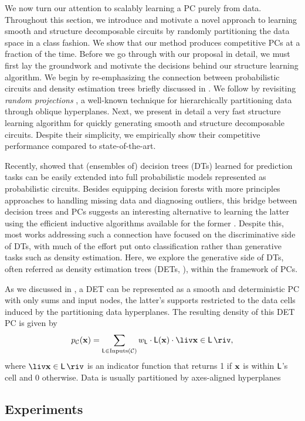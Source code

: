 We now turn our attention to scalably learning a PC purely from data. Throughout this section, we
introduce and motivate a novel approach to learning smooth and structure decomposable circuits by
randomly partitioning the data space in a \divclass{} class fashion. We show that our method
produces competitive PCs at a fraction of the time. Before we go through with our proposal in
detail, we must first lay the groundwork and motivate the decisions behind our structure learning
algorithm. We begin by re-emphasizing the connection between probabilistic circuits and density
estimation trees briefly discussed in . We follow by revisiting \emph{random
projections} \citep{dasgupta08a,dasgupta08b}, a well-known technique for hierarchically
partitioning data through oblique hyperplanes. Next, we present in detail a very fast structure
learning algorithm for quickly generating smooth and structure decomposable circuits. Despite their
simplicity, we empirically show their competitive performance compared to state-of-the-art.

Recently, \citet{correia20} showed that (ensembles of) decision trees (DTs) learned for prediction
tasks can be easily extended into full probabilistic models represented as probabilistic circuits.
Besides equipping decision forests with more principles approaches to handling missing data and
diagnosing outliers, this bridge between decision trees and PCs suggests an interesting alternative
to learning the latter using the efficient inductive algorithms available for the former
\citep{correia20,ram11,khosravi20}. Despite this, most works addressing such a connection have
focused on the discriminative side of DTs, with much of the effort put onto classification rather
than generative tasks such as density estimation. Here, we explore the generative side of DTs,
often referred as density estimation trees (DETs, \cite{ram11,ho19,smyth95}), within the framework
of PCs.

As we discussed in , a DET can be represented as a smooth and deterministic PC with
only sums and input nodes, the latter's supports restricted to the data cells induced by the
partitioning data hyperplanes. The resulting density of this DET PC is given by
\begin{equation*}
  p_\mathcal{C}(\set{x})=\sum_{\Leaf\in\operatorname{Inputs}(\mathcal{C})}w_{\Leaf}\cdot\Leaf(\set{x})\cdot\liv\set{x}\in\Leaf\riv,
\end{equation*}
where $\liv\set{x}\in\Leaf\riv$ is an indicator function that returns 1 if $\mathbf{x}$ is within
$\operatorname{\textsf{L}}$'s cell and 0 otherwise. Data is usually partitioned by axes-aligned hyperplanes 

\subsection{}

\subsection{Experiments}
